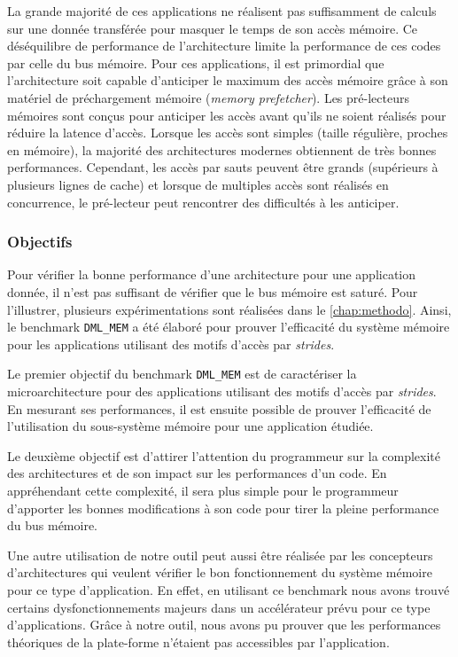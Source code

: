    
        La grande majorité de ces applications ne réalisent pas suffisamment de calculs sur une donnée transférée pour masquer le temps de son accès mémoire. Ce déséquilibre de performance de l'architecture limite la performance de ces codes par celle du bus mémoire. 
        Pour ces applications, il est primordial que l'architecture soit capable d'anticiper le maximum des accès mémoire grâce à son matériel de préchargement mémoire (\textit{memory prefetcher}). Les pré-lecteurs mémoires sont conçus pour anticiper les accès avant qu'ils ne soient réalisés pour réduire la latence d'accès. Lorsque les accès sont simples (taille régulière, proches en mémoire), la majorité des architectures modernes obtiennent de très bonnes performances. Cependant, les accès par sauts peuvent être grands (supérieurs à plusieurs lignes de cache) et lorsque de multiples accès sont réalisés en concurrence, le pré-lecteur peut rencontrer des difficultés à les anticiper. 
    
        

    \subsubsection{Objectifs}
        
        Pour vérifier la bonne performance d'une architecture pour une application donnée, il n'est pas suffisant de vérifier que le bus mémoire est saturé. Pour l'illustrer, plusieurs expérimentations sont réalisées dans le \autoref{chap:methodo}. Ainsi, le benchmark \verb=DML_MEM= a été élaboré pour prouver l'efficacité du système mémoire pour les applications utilisant des motifs d'accès par \textit{strides}. 
    
        Le premier objectif du benchmark \verb=DML_MEM= est de caractériser la microarchitecture pour des applications utilisant des motifs d'accès par \textit{strides}. En mesurant ses performances, il est ensuite possible de prouver l’efficacité de l’utilisation du sous-système mémoire pour une application étudiée. 
        
        Le deuxième objectif est d'attirer l'attention du programmeur sur la complexité des architectures et de son impact sur les performances d'un code. En appréhendant cette complexité, il sera plus simple pour le programmeur d'apporter les bonnes modifications à son code pour tirer la pleine performance du bus mémoire.
        
        Une autre utilisation de notre outil peut aussi être réalisée par les concepteurs d'architectures qui veulent vérifier le bon fonctionnement du système mémoire pour ce type d'application. En effet, en utilisant ce benchmark nous avons trouvé certains dysfonctionnements majeurs dans un accélérateur prévu pour ce type d'applications. Grâce à notre outil, nous avons pu prouver que les performances théoriques de la plate-forme n'étaient pas accessibles par l'application. 
    

